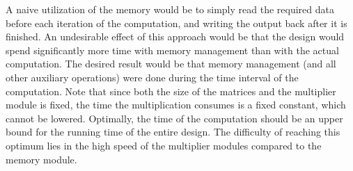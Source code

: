 \documentclass[11pt,twoside]{article}
\begin{document}
A naive utilization of the memory would be to simply read the required data before each iteration of the computation, and writing the output back after it is finished. An undesirable effect of this approach would be that the design would spend significantly more time with memory management than with the actual computation. The desired result would be that memory management (and all other auxiliary operations) were done during the time interval of the computation. Note that since both the size of the matrices and the multiplier module is fixed, the time the multiplication consumes is a fixed constant, which cannot be lowered. Optimally, the time of the computation should be an upper bound for the running time of the entire design. The difficulty of reaching this optimum lies in the high speed of the multiplier modules compared to the memory module.
\end{document}
